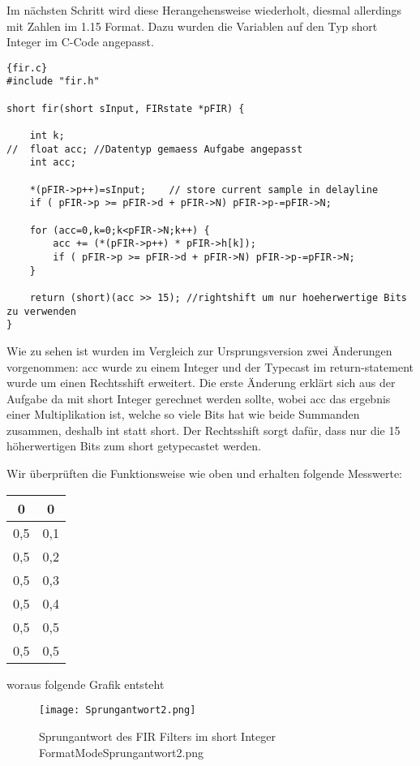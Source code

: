  Im nächsten Schritt wird diese Herangehensweise wiederholt, diesmal allerdings mit Zahlen im 1.15 Format. Dazu wurden die Variablen auf den Typ short Integer im C-Code angepasst.\\
 \begin{adjustbox}{width=\textwidth,height=\textheight,keepaspectratio}
 \begin{lstlisting}[title=fir.c]{fir.c}
#include "fir.h"

short fir(short sInput, FIRstate *pFIR) {

	int k;
//	float acc; //Datentyp gemaess Aufgabe angepasst
	int acc;
	
	*(pFIR->p++)=sInput;	// store current sample in delayline
	if ( pFIR->p >= pFIR->d + pFIR->N) pFIR->p-=pFIR->N;

	for (acc=0,k=0;k<pFIR->N;k++) {
		acc += (*(pFIR->p++) * pFIR->h[k]);
		if ( pFIR->p >= pFIR->d + pFIR->N) pFIR->p-=pFIR->N;
	}
	
	return (short)(acc >> 15); //rightshift um nur hoeherwertige Bits zu verwenden
}
\end{lstlisting}
\end{adjustbox}
Wie zu sehen ist wurden im Vergleich zur Ursprungsversion zwei \"Anderungen vorgenommen: acc wurde zu einem Integer und der Typecast im return-statement wurde um einen Rechtsshift erweitert. Die erste \"Anderung erklärt sich aus der Aufgabe da mit short Integer gerechnet werden sollte, wobei acc das ergebnis einer Multiplikation ist, welche so viele Bits hat wie beide Summanden zusammen, deshalb int statt short. Der Rechtsshift sorgt daf\"ur, dass nur die 15 h\"oherwertigen Bits zum short getypecastet werden.\\\par
Wir \"uberprüften die Funktionsweise wie oben und erhalten folgende Messwerte:
\begin{tabular}{|c|c|}
\hline 
0 & 0 \\ 
\hline 
0,5 & 0,1 \\ 
\hline 
0,5 & 0,2 \\ 
\hline 
0,5 & 0,3 \\ 
\hline 
0,5 & 0,4 \\ 
\hline 
0,5 & 0,5 \\ 
\hline 
0,5 & 0,5 \\ 
\hline 
\end{tabular} 
woraus folgende Grafik entsteht 
\begin{figure}[H]
  \centering
    \texttt{[image: Sprungantwort2.png]}
  \caption{Sprungantwort des FIR Filters im short Integer Format\textunderscore Mode\textunderscore Sprungantwort2.png}
  \label{fig:SprAW2.png}%
\end{figure}

